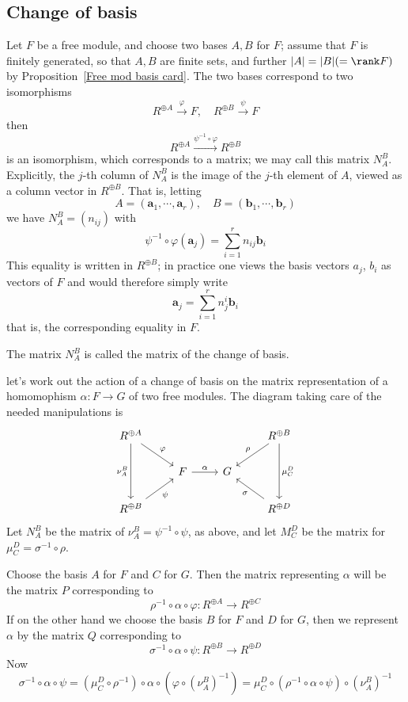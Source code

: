 \subsection{Change of basis}
Let $F$ be a free module, and choose two bases $A, B$ for $F$; assume that $F$ is finitely generated, so that $A,B$ are finite sets, and further $|A|=|B|(=\rank F)$ by Proposition~\ref{Free mod basis card}. The two bases correspond to two isomorphisms
\[R^{\oplus A}\stackrel{\varphi}{\longrightarrow}F,\quad R^{\oplus B}\stackrel{\psi}{\longrightarrow}F\]
then
\[R^{\oplus A}\stackrel{\psi^{-1}\circ\varphi}{\longrightarrow}R^{\oplus B}\]
is an isomorphism, which corresponds to a matrix; we may call this matrix $N^B_A$. Explicitly, the $j$-th column of $N^B_A$ is the image of the $j$-th element of $A$, viewed as a column vector in $R^{\oplus B}$. That is, letting
\[A=(\bm{a}_1,\cdots,\bm{a}_r),\quad B=(\bm{b}_1,\cdots,\bm{b}_r)\]
we have $N^B_A=(n_{ij})$ with
\[\psi^{-1}\circ\varphi(\bm{a}_j)=\sum_{i=1}^{r}n_{ij}\bm{b}_i\]
This equality is written in $R^{\oplus B}$; in practice one views the basis vectors $a_j$, $b_i$ as
vectors of $F$ and would therefore simply write
\[\bm{a}_j=\sum_{i=1}^{r}n^i_j\bm{b}_i\]
that is, the corresponding equality in $F$.
\begin{definition}
The matrix $N^B_A$ is called the matrix of the change of basis.
\end{definition}
let's work out the action of a change of basis on the matrix representation of a homomophism $\alpha:F\to G$ of two free modules. The diagram taking care of the needed manipulations is
\[\begin{tikzcd}
R^{\oplus A}\ar[dd,swap,"\nu_A^B"]\ar[rd,"\varphi"]&&&R^{\oplus B}\ar[dl,swap,"\rho"]\ar[dd,"\mu_C^D"]\\
&F\ar[r,"\alpha"]&G&\\
R^{\oplus B}\ar[ru,swap,"\psi"]&&&R^{\oplus D}\ar[ul,"\sigma"]
\end{tikzcd}\]
Let $N_A^B$ be the matrix of $\nu_A^B=\psi^{-1}\circ\psi$, as above, and let $M_C^D$ be the matrix for $\mu_C^D=\sigma^{-1}\circ\rho$.\par
Choose the basis $A$ for $F$ and $C$ for $G$. Then the matrix representing $\alpha$ will be the matrix $P$ corresponding to
\[\rho^{-1}\circ\alpha\circ\varphi:R^{\oplus A}\to R^{\oplus C}\]
If on the other hand we choose the basis $B$ for $F$ and $D$ for $G$, then we represent $\alpha$ by the matrix $Q$ corresponding to
\[\sigma^{-1}\circ\alpha\circ\psi:R^{\oplus B}\to R^{\oplus D}\]
Now 
\[\sigma^{-1}\circ\alpha\circ\psi=(\mu_C^D\circ\rho^{-1})\circ\alpha\circ(\varphi\circ(\nu_A^B)^{-1})=\mu_C^D\circ(\rho^{-1}\circ\alpha\circ\psi)\circ(\nu_A^B)^{-1}\]
